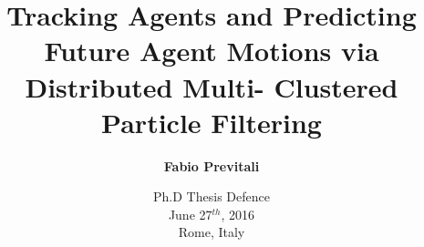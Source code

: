 \documentclass{beamer}
\title[Tracking Agents and Predicting Future Agent Motions via Distributed M-C PF]{\Large Tracking Agents and Predicting Future Agent Motions via Distributed Multi- Clustered Particle Filtering}
\subtitle{}
\author[Fabio Previtali]{\Large\textbf{Fabio Previtali}}
\date[June 27$^{th}$, 2016]{Ph.D Thesis Defence\\June 27$^{th}$, 2016\\Rome, Italy}
\begin{document}
\begin{frame}[plain]
	\titlepage
\end{frame}










\tiny



\appendix


\end{document}
